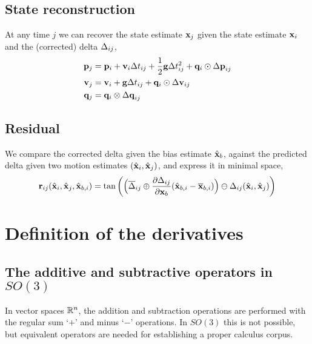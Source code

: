 \subsection{State reconstruction}

At any time $j$ we can recover the state estimate ${\bf x}_j$ given the state estimate ${\bf x}_i$ and the (corrected) delta $\Delta_{ij}$,
%
\begin{align} \label{equ:reconstruction}
\begin{split}
{\bf p}_j &= {\bf p}_i + {\bf v}_i\Delta t_{ij} + \frac12{\bf g}\Delta t_{ij}^2 + {\bf q}_i\odot{\Delta{\bf p}}_{ij} \\
{\bf v}_j &= {\bf v}_i + {\bf g}\Delta t_{ij} + {\bf q}_i\odot{\Delta{\bf v}}_{ij} \\
{\bf q}_j &= {\bf q}_i\otimes{\Delta{\bf q}}_{ij}   
\end{split}
\end{align}

\subsection{Residual}

We compare the corrected delta given the bias estimate $\hat{{\bf x}}_b$, against the predicted delta given two motion estimates $(\hat{{\bf x}}_i,\hat{{\bf x}}_j)$, and express it in minimal space,
%
\begin{align*}
{\bf r}_{ij}(\hat{{\bf x}}_i,\hat{{\bf x}}_j,\hat{{\bf x}}_{b,i}) = \tan\left( \Big(\overline{\Delta}_{ij} \oplus \frac{\partial\Delta_{ij}}{\partial{\bf x}_b} (\hat{{\bf x}}_{b,i} - \overline{{\bf x}}_{b,i})\Big) \ominus \Delta_{ij}(\hat{{\bf x}}_i , \hat{{\bf x}}_j)  \right)
\end{align*}





\newpage
\appendix

\section{Definition of the derivatives }

\subsection{The additive and subtractive operators in $SO(3)$}

In vector spaces ${\mathbb R}^n$, the addition and subtraction operations are performed with the regular sum `$+$' and minus `$-$' operations.
In $SO(3)$ this is not possible, but equivalent operators are needed for establishing a proper calculus corpus. 

